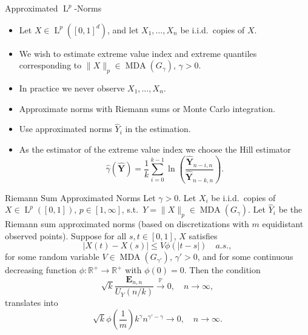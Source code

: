 \documentclass[11pt, aspectratio=169]{beamer}
\DeclareMathOperator{\mda}{MDA}
\DeclareMathOperator{\lp}{L}
\begin{document}
\begin{frame}{Approximated $\lp^p$-Norms}
  \begin{itemize}
    \item Let $X\in \lp^p\left([0, 1]^d\right)$, and let $X_1,\ldots, X_n$ be
    i.i.d.\ copies of $X$.
    \item We wish to estimate extreme value index and extreme quantiles
    corresponding to $\|X\|_p\in\mda\left(G_\gamma\right)$, $\gamma > 0$.
    \pause
    \item In practice we never observe $X_1, \ldots, X_n$.
    \pause
    \item Approximate norms with Riemann sums or Monte Carlo integration.
    \item Use approximated norms $\hat{Y}_i$ in the estimation.
    \pause
    \item As the estimator of the extreme value index we choose the Hill
    estimator
    \begin{equation*}
      \hat\gamma(\hat{\bm Y}) = \frac{1}{k}\sum_{i = 0}^{k-1}
      \ln\left(\frac{\hat{\bm Y}_{n-i,n}}{\hat{\bm Y}_{n-k,n}}\right).
    \end{equation*}
  \end{itemize}
\end{frame}



\begin{frame}{Riemann Sum Approximated Norms}
  Let $\gamma > 0$. Let $X_i$ be i.i.d.\ copies of $X\in
  \lp^p\left([0,1]\right)$, $p\in [1,\infty]$, s.t.\ $Y =
  \|X\|_p\in\mda\left(G_\gamma\right)$. Let $\hat Y_i$ be the Riemann sum
  approximated norms (based on discretizations with $m$ equidistant observed
  points). Suppose for all $s,t\in [0,1]$, $X$ satisfies
  \begin{equation*}
    \left|X(t) - X(s)\right| \leq V\phi\left(|t-s|\right) \quad a.s.,
  \end{equation*}
  for some random variable $V\in\mda\left(G_{\gamma'}\right)$, $\gamma' > 0$,
  and for some continuous decreasing function $\phi:\mathbb{R}^+\to
  \mathbb{R}^+$ with $\phi\left(0\right) = 0$.
  \pause
  Then the condition
  \begin{equation*}
    \sqrt{k}\frac{\bm E_{n,n}}{U_Y\left(n/k\right)}\stackrel{\mathbb{P}}{\to}0,
    \quad n\to\infty,
  \end{equation*}
  translates into
  \begin{equation*}
    \sqrt{k}\phi\left(\frac{1}{m}\right)k^\gamma n^{\gamma' - \gamma}\to 0,
    \quad n\to\infty.
  \end{equation*}
\end{frame}
\end{document}
